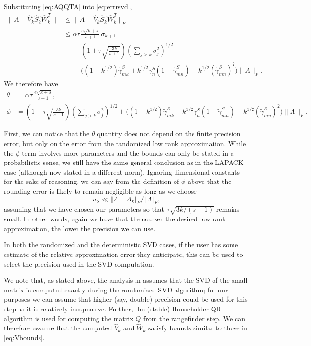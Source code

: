 \documentclass[12pt, a4paper]{article}
\newcommand{\What}{\widehat{W}}
\newcommand{\Shat}{\widehat{S}}
\newcommand{\Vhat}{\widehat{V}}
\theoremstyle{remark}
\begin{document}
Substituting \eqref{eq:AQQTA} into \eqref{eq:errrsvd},
\begin{align*}
\|A-\Vhat_k \Shat_k \What_k^{T}\|
&\le \|A-\Vhat_k \Shat_k \What_k^{T}\|_F\\
&\le \alpha\tau\,\frac{e\sqrt{k+s}}{s+1}\,\sigma_{k+1}\\
&\phantom{\leq}+\left(1+\tau\sqrt{\frac{3k}{s+1}}\right)\left(\sum_{j>k}\sigma_j^2\right)^{1/2}
\\
&\phantom{\leq}+\Big((1+k^{1/2})\widetilde{\gamma}^S_{mk}+k^{1/2}\gamma^S_n(1+\widetilde{\gamma}^S_{mn})+k^{1/2}(\widetilde{\gamma}^S_{mn})^2\Big)\|A\|_F.
\end{align*} 
%
We therefore have
\begin{equation*}
\begin{split}
    \theta &= \alpha\tau\,\frac{e\sqrt{k+s}}{s+1}, \\
    \phi  &= \left(1+\tau\sqrt{\frac{3k}{s+1}}\right)\left(\sum_{j>k}\sigma_j^2\right)^{1/2} + \Big((1+k^{1/2})\widetilde{\gamma}^S_{mk}+k^{1/2}\gamma^S_n(1+\widetilde{\gamma}^S_{mn})+k^{1/2}(\widetilde{\gamma}^S_{mn})^2\Big)\|A\|_F.
\end{split}    
\end{equation*}

First, we can notice that the $\theta$ quantity does not depend on the finite precision error, but only on the error from the randomized low rank approximation. While the $\phi$ term involves more parameters and the bounds can only be stated in a probabilistic sense, we still have the same general conclusion as in the LAPACK case (although now stated in a different norm). Ignoring dimensional constants for the sake of reasoning, we can say from the definition of $\phi$ above that the rounding error is likely to remain negligible as long as we choose 
\begin{equation}
u_S \ll \Vert A-A_k\Vert_F/\Vert A\Vert_F,
    \label{eq:usvdcond2}
\end{equation}
assuming that we have chosen our parameters so that $\tau \sqrt{3k/(s+1)}$ remains small. 
In other words, again we have that the coarser the desired low rank approximation, the lower the precision we can use. 

In both the randomized and the deterministic SVD cases, if the user has some estimate of the relative approximation error they anticipate, this can be used to select the precision used in the SVD computation.

We note that, as stated above, the analysis in \cite{connolly2022randomized} assumes that the SVD of the small matrix is computed exactly during the randomized SVD algorithm; for our purposes we can assume that higher (say, double) precision could be used for this step as it is relatively inexpensive. Further, the (stable) Householder QR algorithm is used for computing the matrix $Q$ from the rangefinder step. We can therefore assume that the computed $\Vhat_k$ and $\What_k$ satisfy bounds similar to those in \eqref{eq:Vbounds}.
\end{document}
